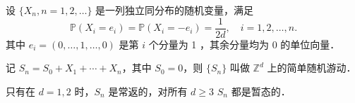 
设 $\{X_n,n=1,2,\ldots\}$ 是一列独立同分布的随机变量，满足
$$\mathbb{P}(X_i=e_i)=\mathbb{P}(X_i=-e_i)=\frac{1}{2d},\quad i=1,2,\ldots,n.$$
其中 $e_i=(0,\ldots,1,\ldots,0)$ 是第 $i$ 个分量为 1 ，其余分量均为 0 的单位向量．

记 $S_n=S_0+X_1+\cdots+X_n$，其中 $S_0=0$，则 $\{S_n\}$ 叫做 $\mathbb{Z}^d$ 上的简单随机游动．

只有在 $d=1,2$ 时，$S_n$ 是常返的，对所有 $d\geq3$ $S_n$ 都是暂态的．